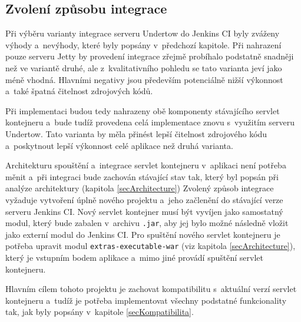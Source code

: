         \subsection{Zvolení způsobu integrace}
            Při výběru varianty integrace serveru Undertow do Jenkins CI byly zváženy
            výhody a~nevýhody, které byly popsány v~předchozí kapitole. Při nahrazení pouze serveru Jetty
            by provedení integrace zřejmě probíhalo podstatně snadněji než ve variantě druhé,
            ale z~kvalitativního pohledu se tato varianta jeví jako méně vhodná. 
            Hlavními 
            negativy jsou především potenciálně nižší výkonnost a~také špatná čitelnost
            zdrojových kódů.

            Při implementaci budou tedy nahrazeny obě komponenty stávajícího servlet kontejneru
            a~bude tudíž provedena celá implementace znovu s~využitím serveru Undertow. Tato
            varianta by měla přinést lepší čitelnost zdrojového kódu a~poskytnout 
            lepší výkonnost celé aplikace než druhá varianta.


            \medskip
            Architekturu spouštění a~integrace servlet kontejneru v~aplikaci není potřeba měnit a~při integraci bude
            zachován stávající stav tak, který byl popsán při analýze architektury (kapitola \ref{secArchitecture})
            Zvolený způsob integrace vyžaduje vytvoření úplně nového projektu a~jeho začlenění do stávající
            verze serveru Jenkins CI. Nový servlet kontejner musí být vyvíjen jako samostatný modul,
            který bude zabalen v~archivu \texttt{.jar}, aby jej bylo možné následně vložit jako externí modul do Jenkins CI.
            Pro spuštění nového servlet kontejneru
            je potřeba upravit modul \texttt{extras-executable-war} (viz kapitola \ref{secArchitecture}), který
            je vstupním bodem aplikace a~mimo jiné provádí spuštění servlet kontejneru.
            
            Hlavním cílem tohoto projektu je zachovat kompatibilitu s~aktuální verzí servlet kontejneru a~tudíž je 
            potřeba implementovat všechny podstatné funkcionality tak, jak byly popsány v~kapitole \ref{secKompatibilita}.
            












